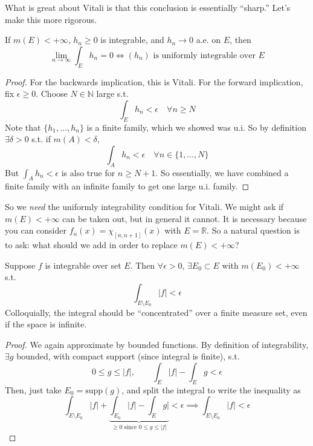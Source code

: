   What is great about Vitali is that this conclusion is essentially ``sharp.'' Let's make this more rigorous. 

  \begin{theorem}
    If $m(E) < +\infty$, $h_n \geq 0$ is integrable, and $h_n \to 0$ a.e. on $E$, then 
    \begin{equation}
      \lim_{n \to \infty} \int_E h_n = 0 \iff (h_n) \text{ is uniformly integrable over } E
    \end{equation}
  \end{theorem}
  \begin{proof}
    For the backwards implication, this is Vitali. For the forward implication, fix $\epsilon \geq 0$. Choose $N \in \mathbb{N}$ large s.t. 
    \begin{equation}
      \int_E h_n < \epsilon \quad \forall n \geq N
    \end{equation}
    Note that $\{h_1, \ldots, h_n\}$ is a finite family, which we showed was u.i. So by definition $\exists \delta > 0$ s.t. if $m(A) < \delta$, 
    \begin{equation}
      \int_A h_n < \epsilon \quad \forall n \in \{1, \ldots, N\} 
    \end{equation}
    But $\int_A h_n < \epsilon$ is also true for $n \geq N +1$. So essentially, we have combined a finite family with an infinite family to get one large u.i. family. 
  \end{proof}

  So we \textit{need} the uniformly integrability condition for Vitali. We might ask if $m(E) < +\infty$ can be taken out, but in general it cannot. It is necessary because you can consider $f_n(x) = \chi_{[n, n+1]} (x)$ with $E = \mathbb{R}$. So a natural question is to ask: what should we add in order to replace $m(E) < +\infty$? 

  \begin{lemma}
    Suppose $f$ is integrable over set $E$. Then $\forall \epsilon > 0$, $\exists E_0 \subset E$ with $m(E_0) < +\infty$ s.t. 
    \begin{equation}
      \int_{E \setminus E_0} |f| < \epsilon
    \end{equation}
    Colloquially, the integral should be ``concentrated'' over a finite measure set, even if the space is infinite. 
  \end{lemma}
  \begin{proof}
    We again approximate by bounded functions. By definition of integrability, $\exists g$ bounded, with compact support (since integral is finite), s.t. 
    \begin{equation}
      0 \leq g \leq |f|, \qquad \int_E |f| - \int_E g < \epsilon
    \end{equation}
    Then, just take $E_0 = \mathrm{supp}(g)$, and split the integral to write the inequality as 
    \begin{equation}
      \int_{E \setminus E_0} |f| + \underbrace{\int_{E_0} |f|  - \int_E g|}_{\geq 0 \text{ since } 0 \leq g \leq |f|} < \epsilon \implies  \int_{E \setminus E_0} |f| < \epsilon
    \end{equation}
  \end{proof}

